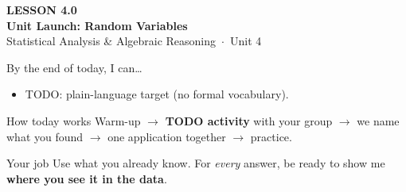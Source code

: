 \documentclass[aspectratio=169, 11pt]{beamer}
\begin{document}
{
\begin{frame}[plain]
  \vspace{2.8cm}\hspace{0.55cm}%
  \begin{minipage}{0.9\textwidth}
    {\color{goldacc}\bfseries\small LESSON 4.0}\\[0.5cm]
    {\color{white}\bfseries\LARGE Unit Launch: Random Variables}\\[1.2cm]
    {\color{frostmid}\small Statistical Analysis \& Algebraic Reasoning~$\cdot$~Unit 4}
  \end{minipage}
\end{frame}
}

\newcommand{\redink}[1]{{\color{redacc}\bfseries #1}}

\begin{frame}[t, plain]
  By the end of today, I can\ldots
  \begin{itemize}\setlength{\itemsep}{6pt}
    \item TODO: plain-language target (no formal vocabulary).
  \end{itemize}
  \begin{block}{How today works}
    Warm-up $\to$ \textbf{TODO activity} with your group $\to$ we name what you found $\to$
    one application together $\to$ practice.
  \end{block}
\end{frame}

\begin{frame}[t, plain]
\end{frame}

\begin{frame}[t, plain]
  \begin{block}{Your job}
    Use what you already know. For \emph{every} answer, be ready to show me
    \textbf{where you see it in the data}.
  \end{block}
\end{frame}
\end{document}
